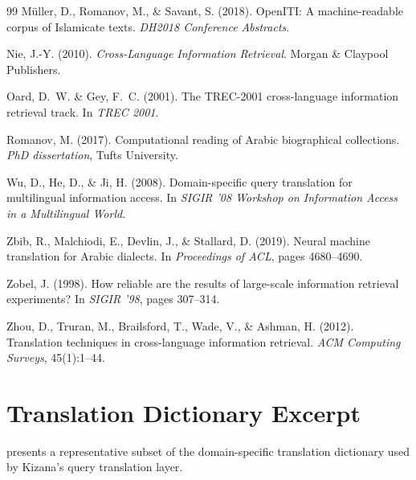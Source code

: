 \documentclass[preprint,12pt,numbers]{elsarticle}
\begin{document}
\begin{thebibliography}{99}
M{\"u}ller, D., Romanov, M., \& Savant, S. (2018).
\newblock OpenITI: A machine-readable corpus of Islamicate texts.
\newblock \textit{DH2018 Conference Abstracts}.

Nie, J.-Y. (2010).
\newblock \textit{Cross-Language Information Retrieval}.
\newblock Morgan \& Claypool Publishers.

Oard, D.~W. \& Gey, F.~C. (2001).
\newblock The TREC-2001 cross-language information retrieval track.
\newblock In \textit{TREC 2001}.

Romanov, M. (2017).
\newblock Computational reading of Arabic biographical collections.
\newblock \textit{PhD dissertation}, Tufts University.

Wu, D., He, D., \& Ji, H. (2008).
\newblock Domain-specific query translation for multilingual information access.
\newblock In \textit{SIGIR '08 Workshop on Information Access in a Multilingual World}.

Zbib, R., Malchiodi, E., Devlin, J., \& Stallard, D. (2019).
\newblock Neural machine translation for Arabic dialects.
\newblock In \textit{Proceedings of ACL}, pages 4680--4690.

Zobel, J. (1998).
\newblock How reliable are the results of large-scale information retrieval experiments?
\newblock In \textit{SIGIR '98}, pages 307--314.

Zhou, D., Truran, M., Brailsford, T., Wade, V., \& Ashman, H. (2012).
\newblock Translation techniques in cross-language information retrieval.
\newblock \textit{ACM Computing Surveys}, 45(1):1--44.

\end{thebibliography}

\appendix

\section{Translation Dictionary Excerpt}
\label{appendix:dictionary}

 presents a representative subset of the domain-specific translation dictionary used by Kizana's query translation layer.
\end{document}

